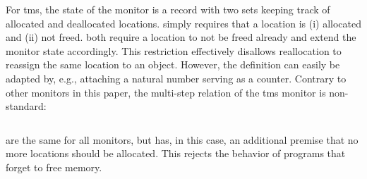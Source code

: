 \documentclass[utf8,acmsmall,review,screen,dvipsnames,anonymous]{acmart}
\begin{document}
For \gls{tms}, the state of the monitor is a record with two sets keeping track of allocated and deallocated locations.
 simply requires that a location is (i) allocated and (ii) not freed.
 both require a location to not be freed already and extend the monitor state accordingly.
This restriction effectively disallows reallocation to reassign the same location to an object.
However, the definition can easily be adapted by, e.g., attaching a natural number serving as a counter.
Contrary to other monitors in this paper, the multi-step relation of the \gls{tms} monitor is non-standard:
\begin{center}
  $\;$\\
\end{center}
 are the same for all monitors, but  has, in this case, an additional premise that no more locations should be allocated.
This rejects the behavior of programs that forget to free memory.

\begin{center}
  $\;$\\
\end{center}
\end{document}
